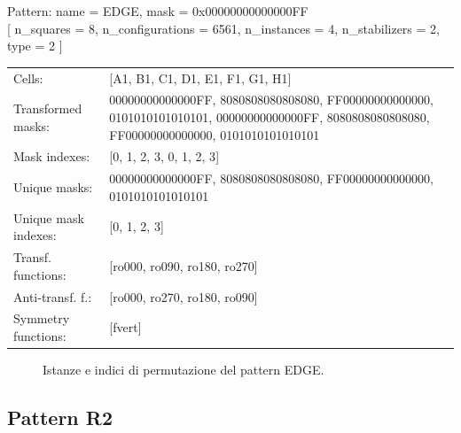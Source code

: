 \begin{tcolorbox}[sharp corners, fontupper=\ttfamily\small, colback=white]
  \noindent Pattern: name = EDGE, mask = 0x00000000000000FF\\
  {[} n\_squares = 8, n\_configurations = 6561,
  n\_instances = 4, n\_stabilizers = 2, type = 2 { ]}\\[1.0ex]
  \begin{tabularx}{\textwidth}{@{} p{3.5cm} X @{}}
    Cells:               & {[}A1, B1, C1, D1, E1, F1, G1, H1{]}\\[0.5ex]
    Transformed masks:   & 00000000000000FF, 8080808080808080, FF00000000000000, 0101010101010101, 00000000000000FF, 8080808080808080, FF00000000000000, 0101010101010101\\[0.5ex]
    Mask indexes:        & {[}0, 1, 2, 3, 0, 1, 2, 3{]}\\[0.5ex]
    Unique masks:        & 00000000000000FF, 8080808080808080, FF00000000000000, 0101010101010101\\[0.5ex]
    Unique mask indexes: & {[}0, 1, 2, 3{]}\\[0.5ex]
    Transf. functions:   & {[}ro000, ro090, ro180, ro270{]}\\[0.5ex]
    Anti-transf. f.:     & {[}ro000, ro270, ro180, ro090{]}\\[0.5ex]
    Symmetry functions:  & {[}fvert{]}\\[0.5ex]
  \end{tabularx}
\end{tcolorbox}

\begin{figure}[htbp]
  \centering
   \hfill
   \hfill
   \hfill
  \vspace{0.3cm}
   \hfill
   \hfill
   \hfill
  \caption{Istanze e indici di permutazione del pattern EDGE.}
\end{figure}

\newpage

\subsection{Pattern R2}

